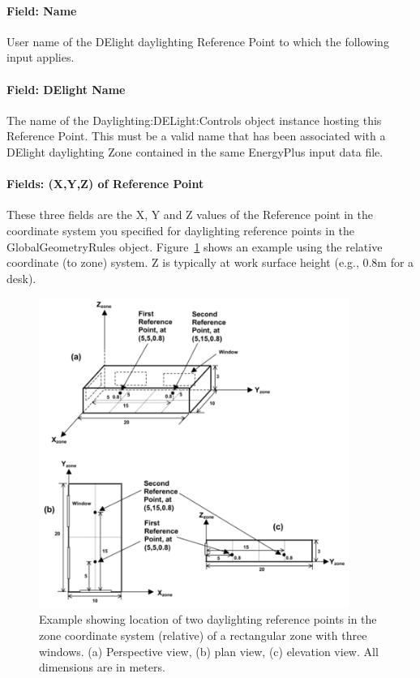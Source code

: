 \paragraph{Field: Name}\label{field-name-1-007}

User name of the DElight daylighting Reference Point to which the following input applies.

\paragraph{Field: DElight Name}\label{field-delight-name}

The name of the Daylighting:DELight:Controls object instance hosting this Reference Point. This must be a valid name that has been associated with a DElight daylighting Zone contained in the same EnergyPlus input data file.

\paragraph{Fields: (X,Y,Z) of Reference Point}\label{fields-xyz-of-reference-point}

These three fields are the X, Y and Z values of the Reference point in the coordinate system you specified for daylighting reference points in the GlobalGeometryRules object. Figure~\ref{fig:example-showing-location-of-two-daylighting} shows an example using the relative coordinate (to zone) system. Z is typically at work surface height (e.g., 0.8m for a desk).

\begin{figure}[hbtp] %
\centering
\includegraphics[width=0.9\textwidth, height=0.9\textheight, keepaspectratio=true]{media/image107.png}
\caption{Example showing location of two daylighting reference points in the zone coordinate system (relative) of a rectangular zone with three windows. (a) Perspective view, (b) plan view, (c) elevation view. All dimensions are in meters. \protect \label{fig:example-showing-location-of-two-daylighting}}
\end{figure}

